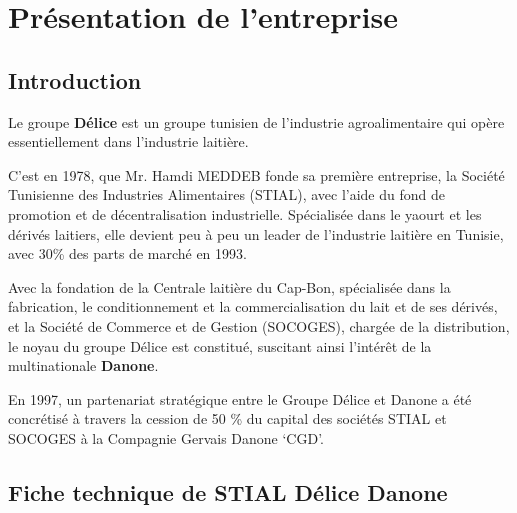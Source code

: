 \chapter*{Présentation de l’entreprise}
\setcounter{mtc}{2} %
\minitoc  %
\graphicspath{{Summary/figures/}}
\pagestyle{fancy}
\fancyhf{}
\fancyhead[R]{\bfseries\rightmark}
\fancyfoot[R]{\thepage}
\renewcommand{\headrulewidth}{0.5pt}
\renewcommand{\footrulewidth}{0pt}
\renewcommand{\chaptermark}[1]{\markboth{\MakeUppercase{\chaptername~\thechapter. #1 }}{}}
\renewcommand{\sectionmark}[1]{\markright{\thechapter.\thesection~ #1}}
\begin{spacing}{1.2}

\section*{Introduction}
Le groupe \textbf{Délice} est un groupe tunisien de l’industrie agroalimentaire qui opère essentiellement dans l’industrie laitière.\newline


C’est en 1978, que Mr. Hamdi MEDDEB fonde sa première entreprise, la Société Tunisienne des Industries Alimentaires (STIAL), avec l’aide du fond de promotion et de décentralisation industrielle. Spécialisée dans le yaourt et les dérivés laitiers, elle devient peu à peu un leader de l’industrie laitière en Tunisie, avec 30\% des parts de marché en 1993.\newline


Avec la fondation de la Centrale laitière du Cap-Bon, spécialisée dans la fabrication, le conditionnement et la commercialisation du lait et de ses dérivés, et la Société de Commerce et de Gestion (SOCOGES), chargée de la distribution, le noyau du groupe Délice est constitué, suscitant ainsi l’intérêt de la multinationale \textbf{Danone}.\newline


En 1997, un partenariat stratégique entre le Groupe Délice et Danone a été concrétisé à travers la cession de 50 \% du capital des sociétés STIAL et SOCOGES à la Compagnie Gervais Danone `CGD'.\newline

\section{Fiche technique de STIAL Délice Danone}


\end{spacing}

